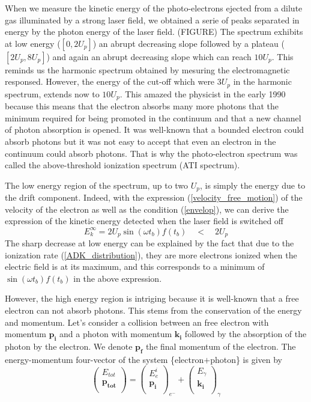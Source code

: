 \documentclass[a4paper]{article}
\begin{document}
When we measure the kinetic energy of the photo-electrons ejected from a dilute gas illuminated by a strong laser field, we obtained a serie of peaks separated in energy by the photon energy of the laser field. (FIGURE) The spectrum exhibits at low energy ($[0,2U_{p}]$) an abrupt decreasing slope followed by a plateau ($[2U_{p},8U_{p}]$) and again an abrupt decreasing slope which can reach $10 U_{p}$. This reminds us the harmonic spectrum obtained by mesuring the electromagnetic responsed. However, the energy of the cut-off which were $3U_{p}$ in the harmonic spectrum, extends now to $10U_{p}$. This amazed the physicist in the early 1990 because this means that the electron absorbs many more photons that the minimum required for being promoted in the continuum and that a new channel of photon absorption is opened. It was well-known that a bounded electron could absorb photons but it was not easy to accept that even an electron in the continuum could absorb photons. That is why the photo-electron spectrum was called the above-threshold ionization spectrum (ATI spectrum).
\par
The low energy region of the spectrum, up to two $U_{p}$, is simply the energy due to the drift component. Indeed, with the expression (\ref{velocity_free_motion}) of the velocity of the electron as well as the condition (\ref{envelop}), we can derive the expression of the kinetic energy detected when the laser field is switched off
\begin{equation}
E_{k}^{\infty}=2U_{p}\sin(\omega t_{b})f(t_{b}) \quad < \quad 2U_{p}
\end{equation}
The sharp decrease at low energy can be explained by the fact that due to the ionization rate (\ref{ADK_distribution}), they are more electrons ionized when the electric field is at its maximum, and this corresponds to a minimum of $\sin(\omega t_{b})f(t_{b})$ in the above expression.
\par
However, the high energy region is intriging because it is well-known that a free electron can not absorb photons. This stems from the conservation of the energy and momentum. Let's consider a collision between an free electron with momentum $\mathbf{p_{i}}$ and a photon with momentum $\mathbf{k_{i}}$ followed by the absorption of the photon by the electron. We denote $\mathbf{p_{f}}$ the final momentum of the electron. The energy-momentum four-vector of the system \{electron$+$photon\} is given by
\begin{equation}
\left(
\begin{array}{c}
E_{tot}\\
\mathbf{p_{tot}}\\
\end{array}
\right)
=
\left(
\begin{array}{c}
E_{e}^{i}\\
\mathbf{p_{i}}\\
\end{array}
\right)_{e^{-}}
+\left(
\begin{array}{c}
E_{\gamma}\\
\mathbf{k_{i}}\\
\end{array}
\right)_{\gamma}
\end{equation}
\end{document}
